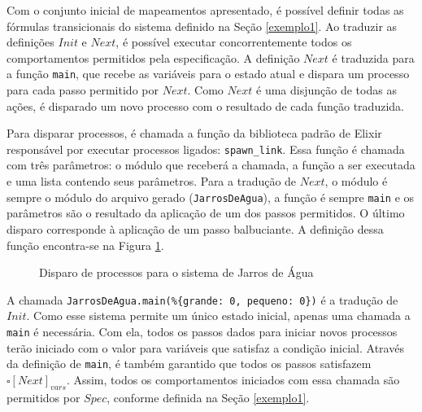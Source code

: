 Com o conjunto inicial de mapeamentos apresentado, é possível definir todas as fórmulas transicionais do sistema definido na Seção \ref{exemplo1}. Ao traduzir as definições $Init$ e $Next$, é possível executar concorrentemente todos os comportamentos permitidos pela especificação. A definição $Next$ é traduzida para a função \texttt{main}, que recebe as variáveis para o estado atual e dispara um processo para cada passo permitido por $Next$. Como $Next$ é uma disjunção de todas as ações, é disparado um novo processo com o resultado de cada função traduzida.

Para disparar processos, é chamada a função da biblioteca padrão de Elixir responsável por executar processos ligados: \texttt{spawn\_link}. Essa função é chamada com três parâmetros: o módulo que receberá a chamada, a função a ser executada e uma lista contendo seus parâmetros. Para a tradução de $Next$, o módulo é sempre o módulo do arquivo gerado (\texttt{JarrosDeAgua}), a função é sempre \texttt{main} e os parâmetros são o resultado da aplicação de um dos passos permitidos. O último disparo corresponde à aplicação de um passo balbuciante. A definição dessa função encontra-se na Figura \ref{fig:main-ex1}.

\begin{figure}[h]
  \centering
  \caption{Disparo de processos para o sistema de Jarros de Água}
\label{fig:main-ex1}
\end{figure}

A chamada \texttt{JarrosDeAgua.main(\%\{grande: 0, pequeno: 0\})} é a tradução de $Init$. Como esse sistema permite um único estado inicial, apenas uma chamada a \texttt{main} é necessária. Com ela, todos os passos dados para iniciar novos processos terão iniciado com o valor para variáveis que satisfaz a condição inicial. Através da definição de \texttt{main}, é também garantido que todos os passos satisfazem $\square [Next]_{vars}$. Assim, todos os comportamentos iniciados com essa chamada são permitidos por $Spec$, conforme definida na Seção \ref{exemplo1}.

